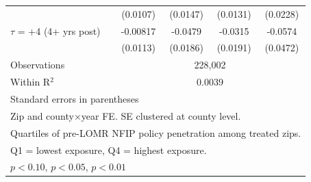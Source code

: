 \begin{table}[htbp]
\begin{tabular}{l*{4}{c}}
                    &    (0.0107)         &    (0.0147)         &    (0.0131)         &    (0.0228)         \\
[0.3em]
$\tau$ = +4 (4+ yrs post)&    -0.00817         &     -0.0479\sym{**} &     -0.0315         &     -0.0574         \\
                    &    (0.0113)         &    (0.0186)         &    (0.0191)         &    (0.0472)         \\
\hline
Observations        &\multicolumn{4}{c}{228,002}\\
Within R$^2$        &\multicolumn{4}{c}{0.0039}\\
\hline\hline
\multicolumn{5}{l}{\footnotesize Standard errors in parentheses}\\
\multicolumn{5}{l}{\footnotesize Zip and county×year FE. SE clustered at county level.}\\
\multicolumn{5}{l}{\footnotesize Quartiles of pre-LOMR NFIP policy penetration among treated zips.}\\
\multicolumn{5}{l}{\footnotesize Q1 = lowest exposure, Q4 = highest exposure.}\\
\multicolumn{5}{l}{\footnotesize \sym{*} \(p<0.10\), \sym{**} \(p<0.05\), \sym{***} \(p<0.01\)}\\
\end{tabular}
\end{table}
